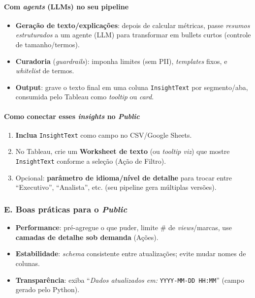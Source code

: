 \paragraph{Com \emph{agents} (LLMs) no seu pipeline}
\begin{itemize}[leftmargin=*]
\item \textbf{Geração de texto/explicações}: depois de calcular métricas, passe \emph{resumos estruturados} a um agente (LLM) para transformar em bullets curtos (controle de tamanho/termos).
\item \textbf{Curadoria} (\emph{guardrails}): imponha limites (sem PII), \emph{templates} fixos, e \emph{whitelist} de termos.
\item \textbf{Output}: grave o texto final em uma coluna \texttt{InsightText} por segmento/aba, consumida pelo Tableau como \emph{tooltip} ou \emph{card}.
\end{itemize}

\paragraph{Como conectar esses \emph{insights} no \textit{Public}}
\begin{enumerate}[leftmargin=*]
\item \textbf{Inclua} \texttt{InsightText} como campo no CSV/Google Sheets.
\item No Tableau, crie um \textbf{Worksheet de texto} (ou \emph{tooltip viz}) que mostre \texttt{InsightText} conforme a seleção (Ação de Filtro).
\item Opcional: \textbf{parâmetro de idioma/nível de detalhe} para trocar entre “Executivo”, “Analista”, etc. (seu pipeline gera múltiplas versões).
\end{enumerate}

\subsubsection*{E. Boas práticas para o \textit{Public}}
\begin{itemize}[leftmargin=*]
\item \textbf{Performance}: pré-agregue o que puder, limite # de \emph{views}/marcas, use \textbf{camadas de detalhe sob demanda} (Ações).
\item \textbf{Estabilidade}: \emph{schema} consistente entre atualizações; evite mudar nomes de colunas.
\item \textbf{Transparência}: exiba “\emph{Dados atualizados em:} \texttt{YYYY-MM-DD HH:MM}” (campo gerado pelo Python).
\end{itemize}

